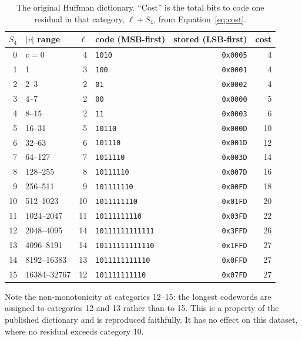 \begin{table}[h]
\centering
\caption[The original Huffman dictionary]{The original Huffman dictionary. ``Cost'' is
the total bits to code one residual in that category, $\ell + S_4$, from
Equation~\eqref{eq:cost}.}
\label{tab:huffman}
\small
\begin{tabular}{@{}rlrlrr@{}}
\toprule
$S_4$ & $|v|$ range & $\ell$ & code (MSB-first) & stored (LSB-first) & cost \\
\midrule
0  & $v = 0$          & 4  & \texttt{1010}           & \texttt{0x0005} & 4 \\
1  & 1                & 3  & \texttt{100}            & \texttt{0x0001} & 4 \\
2  & 2--3             & 2  & \texttt{01}             & \texttt{0x0002} & 4 \\
3  & 4--7             & 2  & \texttt{00}             & \texttt{0x0000} & 5 \\
4  & 8--15            & 2  & \texttt{11}             & \texttt{0x0003} & 6 \\
5  & 16--31           & 5  & \texttt{10110}          & \texttt{0x000D} & 10 \\
6  & 32--63           & 6  & \texttt{101110}         & \texttt{0x001D} & 12 \\
7  & 64--127          & 7  & \texttt{1011110}        & \texttt{0x003D} & 14 \\
8  & 128--255         & 8  & \texttt{10111110}       & \texttt{0x007D} & 16 \\
9  & 256--511         & 9  & \texttt{101111110}      & \texttt{0x00FD} & 18 \\
10 & 512--1023        & 10 & \texttt{1011111110}     & \texttt{0x01FD} & 20 \\
11 & 1024--2047       & 11 & \texttt{10111111110}    & \texttt{0x03FD} & 22 \\
12 & 2048--4095       & 14 & \texttt{10111111111111} & \texttt{0x3FFD} & 26 \\
13 & 4096--8191       & 14 & \texttt{10111111111110} & \texttt{0x1FFD} & 27 \\
14 & 8192--16383      & 13 & \texttt{1011111111110}  & \texttt{0x0FFD} & 27 \\
15 & 16384--32767     & 12 & \texttt{101111111110}   & \texttt{0x07FD} & 27 \\
\bottomrule
\end{tabular}
\end{table}

\noindent
Note the non-monotonicity at categories 12--15: the longest codewords are
assigned to categories 12 and 13 rather than to 15. This is a property of the
published dictionary and is reproduced faithfully. It has no effect on this
dataset, where no residual exceeds category 10.


